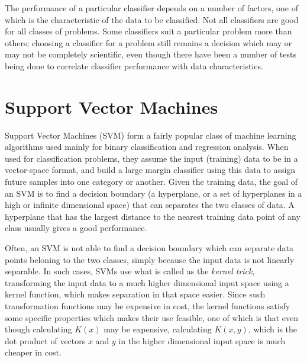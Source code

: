 The performance of a particular classifier depends on a number of factors, one of which is the characteristic of the data to be classified. Not all classifiers are good for all classes of problems. Some classifiers suit a particular problem more than others; choosing a classifier for a problem still remains a decision which may or may not be completely scientific, even though there have been a number of tests being done to correlate classifier performance with data characteristics.

\section{Support Vector Machines}
Support Vector Machines (SVM) form a fairly popular class of machine learning algorithms used mainly for binary classification and regression analysis. When used for classification problems, they assume the input (training) data to be in a vector-space format, and build a large margin classifier using this data to assign future samples into one category or another. Given the training data, the goal of an SVM is to find a decision boundary (a hyperplane, or a set of hyperplanes in a high or infinite dimensional space) that can separates the two classes of data. A hyperplane that has the largest distance to the nearest training data point of any class usually gives a good performance.

Often, an SVM is not able to find a decision boundary which can separate data points beloning to the two classes, simply because the input data is not linearly separable. In such cases, SVMs use what is called as the \emph{kernel trick}, transforming the input data to a much higher dimensional input space using a kernel function, which makes separation in that space easier. Since such transformation functions may be expensive in cost, the kernel functions satisfy some specific properties which makes their use feasible, one of which is that even though calculating $K(x)$ may be expensive, calculating $K(x, y)$, which is the dot product of vectors $x$ and $y$ in the higher dimensional input space is much cheaper in cost.
